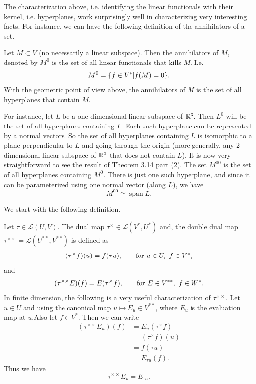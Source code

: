 \begin{observation}
	The characterization above, i.e. identifying the linear functionals with their kernel, i.e. hyperplanes, work surprisingly well in characterizing very interesting facts. For instance, we can have the following definition of the annihilators of a set.
	\begin{definition}[Annihilators]
		Let $ M \subset V $ (no necessarily a linear subspace). Then the annihilators of $ M $, denoted by $ M^0 $ is the set of all linear functionals that kills $ M $. I.e.
		\[ M^0 = \{f \in V^*| f(M) = 0\}. \]
		With the geometric point of view above, the annihilators of $ M $ is the set of all hyperplanes that contain $ M $.
	\end{definition}
	For instance, let $ L $ be a one dimensional linear subspace of $ \mathbb{R}^3 $. Then $ L^0 $ will be the set of all hyperplanes containing $ L $. Each such hyperplane can be represented by a normal vectors. So the set of all hyperplanes containing $ L $ is isomorphic to a plane perpendicular to $ L $ and going through the origin (more generally, any 2-dimensional linear subspace of $ \mathbb{R}^3 $ that does not contain $ L $). It is now very straightforward to see the result of Theorem 3.14 part (2). The set $ M^{00} $ is the set of all hyperplanes containing $ M^0 $. There is just one such hyperplane, and since it can be parameterized using one normal vector (along $ L $), we have 
	\[ M^{00} \simeq \operatorname{span}L. \]
\end{observation}


\begin{observation}
	We start with the following definition.
	\begin{definition}
		Let $ \tau \in \mathcal{L}(U,V) $. The dual map $ \tau^\times \in \mathcal{L}(V^*,U^*) $ and, the double dual map $ \tau^{\times\times} = \mathcal{L}(U^{**},V^{**}) $ is defined as
		\[  (\tau^\times f)(u) = f(\tau u), \qquad \text{for $ u\in U,\ f\in V^* $}, \]
		and 
		\[  (\tau^{\times\times} E)(f) = E (\tau^\times f), \qquad \text{for $ E\in V^{**},\ f\in W^* $}.  \]
		In finite dimension, the following is a very useful characterization of $ \tau^{\times\times} $. Let $ u\in U $ and using the canonical map $ u \mapsto E_u \in V^{**} $, where $ E_u $ is the evaluation map at $ u $.Also let $ f\in V^* $. Then we can write
		\begin{align*}
			(\tau^{\times\times} E_u)(f) &= E_u(\tau^\times f) \\
			&= (\tau^\times f)(u) \\
			&=f(\tau u) \\
			&=E_{\tau u} (f).
		\end{align*} 
		Thus we have
		\[ \tau^{\times\times}E_u = E_{\tau u}. \]
	\end{definition}
\end{observation}

